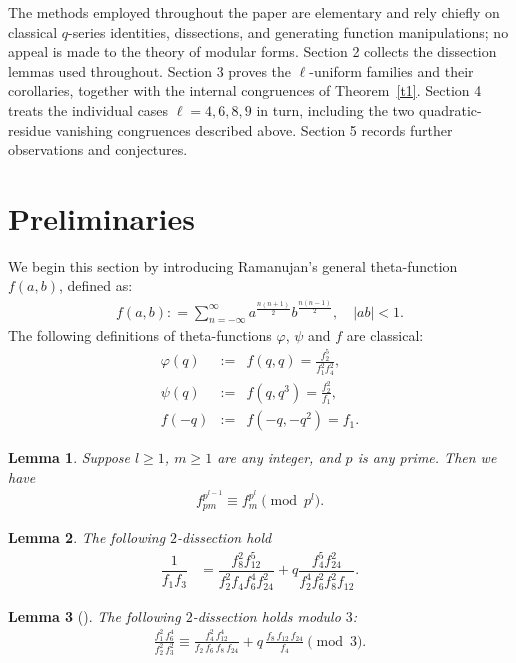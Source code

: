 \documentclass[11pt, reqno]{amsart}
\newtheorem{lma}{Lemma}[section]
\numberwithin{equation}{section}
\begin{document}
	The methods employed throughout the paper are elementary and rely chiefly on classical $q$-series identities, dissections, and generating function manipulations; no appeal is made to the theory of modular forms. Section 2 collects the dissection lemmas used throughout. Section 3 proves the $\ell$-uniform families and their corollaries, together with the internal congruences of Theorem~\ref{t1}. Section 4 treats the individual cases $\ell=4,6,8,9$ in turn, including the two quadratic-residue vanishing congruences described above. Section 5 records further observations and conjectures.
	
	\section{Preliminaries}
	\noindent We begin this section by introducing Ramanujan's general theta-function $f(a,b)$, defined as:
	\begin{align}
		f(a,b): = \sum_{n=-\infty}^{\infty} a^{\frac{n(n+1)}{2}} b^{\frac{n(n-1)}{2}}, \quad |ab| < 1.
	\end{align}
	The following definitions of theta-functions $\varphi$, $\psi$ and $f$ are classical:
	\begin{eqnarray}
		\varphi(q)&:=&f(q,q)= \frac{f_2^5}{f_1^2f_4^2},\\
		\psi(q)&:=&f(q,q^3) =\frac{f_2^2}{f_1},\\
		f(-q)&:=&f(-q,-q^2)=f_1.
	\end{eqnarray}
	\begin{lma}
		Suppose $l \geq 1$, $m \geq 1$ are any integer, and $p$ is any prime. Then we have
		\begin{align}\label{bt}
			f^{p^{l-1}}_{pm} \equiv f_{m}^{p^{l}} \pmod {p^l}.
		\end{align}
	\end{lma}
	\begin{lma}\cite{NBK}\label{l2}
		The following $2$-dissection hold
		\begin{align}
			\dfrac{1}{f_1f_3}&=\dfrac{f_8^2f_{12}^5}{f_2^2f_4f_6^4f_{24}^2}+q\dfrac{f_4^5f_{24}^2}{f_2^4f_6^2f_8^2f_{12}}.\label{1byf1f3}
		\end{align}
	\end{lma}
	\begin{lma}[{\cite{xia2013analogues}}]\label{l2b}
		The following $2$-dissection holds modulo $3$:
		\begin{align}
			\frac{f_1^2\,f_6^4}{f_2^2\,f_3^2}
			\equiv
			\frac{f_4^2\,f_{12}^4}{f_2\,f_6\,f_8\,f_{24}}
			+q\,\frac{f_8\,f_{12}\,f_{24}}{f_4}
			\pmod{3}.\label{f12byf33}
		\end{align}
	\end{lma}
\end{document}
